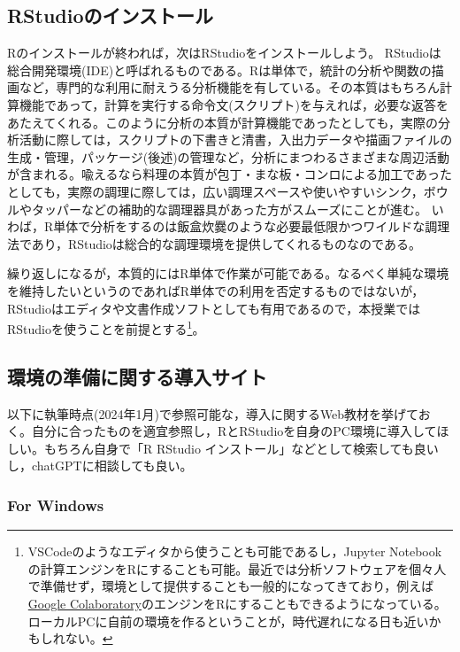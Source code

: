 \documentclass[
  a4paper,
]{ltjsbook}
\begin{document}
\subsection{RStudioのインストール}\label{rstudioux306eux30a4ux30f3ux30b9ux30c8ux30fcux30eb}

Rのインストールが終われば，次はRStudioをインストールしよう。
RStudioは総合開発環境(IDE)と呼ばれるものである。Rは単体で，統計の分析や関数の描画など，専門的な利用に耐えうる分析機能を有している。その本質はもちろん計算機能であって，計算を実行する命令文(スクリプト)を与えれば，必要な返答をあたえてくれる。このように分析の本質が計算機能であったとしても，実際の分析活動に際しては，スクリプトの下書きと清書，入出力データや描画ファイルの生成・管理，パッケージ(後述)の管理など，分析にまつわるさまざまな周辺活動が含まれる。喩えるなら料理の本質が包丁・まな板・コンロによる加工であったとしても，実際の調理に際しては，広い調理スペースや使いやすいシンク，ボウルやタッパーなどの補助的な調理器具があった方がスムーズにことが進む。
いわば，R単体で分析をするのは飯盒炊爨のような必要最低限かつワイルドな調理法であり，RStudioは総合的な調理環境を提供してくれるものなのである。

繰り返しになるが，本質的にはR単体で作業が可能である。なるべく単純な環境を維持したいというのであればR単体での利用を否定するものではないが，RStudioはエディタや文書作成ソフトとしても有用であるので，本授業ではRStudioを使うことを前提とする\footnote{VSCodeのようなエディタから使うことも可能であるし，Jupyter
  Notebookの計算エンジンをRにすることも可能。最近では分析ソフトウェアを個々人で準備せず，環境として提供することも一般的になってきており，例えば\href{https://colab.research.google.com/}{Google
  Colaboratory}のエンジンをRにすることもできるようになっている。ローカルPCに自前の環境を作るということが，時代遅れになる日も近いかもしれない。}。

\subsection{環境の準備に関する導入サイト}\label{ux74b0ux5883ux306eux6e96ux5099ux306bux95a2ux3059ux308bux5c0eux5165ux30b5ux30a4ux30c8}

以下に執筆時点(2024年1月)で参照可能な，導入に関するWeb教材を挙げておく。自分に合ったものを適宜参照し，RとRStudioを自身のPC環境に導入してほしい。もちろん自身で「R
RStudio
インストール」などとして検索しても良いし，chatGPTに相談しても良い。

\subsubsection{For Windows}\label{for-windows}
\end{document}
